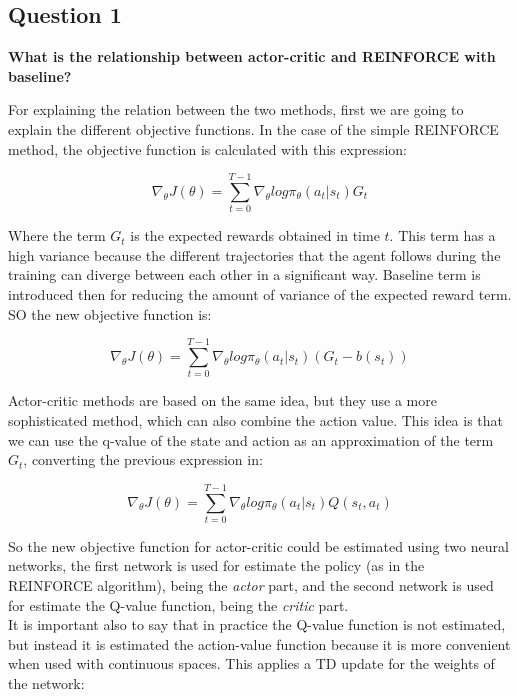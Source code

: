 \documentclass[12pt]{article}
\begin{document}
\subsection{Question 1}
\textbf{What is the relationship between actor-critic and REINFORCE with baseline?}

For explaining the relation between the two methods, first we are going to explain the different objective functions. In the case of the simple REINFORCE method, the objective function is calculated with this expression:

\begin{equation}
    \nabla_\theta J(\theta) = \sum^{T-1}_{t=0}\nabla_\theta log\pi_\theta(a_t|s_t)G_t
\end{equation}

Where the term $G_t$ is the expected rewards obtained in time $t$. This term has a high variance because the different trajectories that the agent follows during the training can diverge between each other in a significant way. Baseline term is introduced then for reducing the amount of variance of the expected reward term. SO the new objective function is:

\begin{equation}
    \nabla_\theta J(\theta) = \sum^{T-1}_{t=0}\nabla_\theta log\pi_\theta(a_t|s_t)(G_t - b(s_t))
\end{equation}

Actor-critic methods are based on the same idea, but they use a more sophisticated method, which can also combine the action value. This idea is that we can use the q-value of the state and action as an approximation of the term $G_t$, converting the previous expression in:

\begin{equation}
    \nabla_\theta J(\theta) = \sum^{T-1}_{t=0}\nabla_\theta log\pi_\theta(a_t|s_t)Q(s_t, a_t)
\end{equation}

So the new objective function for actor-critic could be estimated using two neural networks, the first network is used for estimate the policy (as in the REINFORCE algorithm), being the \textit{actor} part, and the second network is used for estimate the Q-value function, being the \textit{critic} part. \\

It is important also to say that in practice the Q-value function is not estimated, but instead it is estimated the action-value function because it is more convenient when used with continuous spaces. This applies a TD update for the weights of the network:
\end{document}

